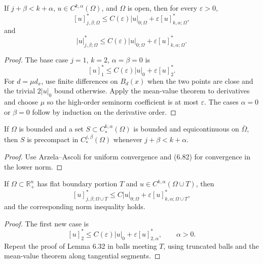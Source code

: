 \begin{lemma}
\label{gt-ch06-lem-6-32}
If $j+\beta<k+\alpha$, $u\in C^{k,\alpha}(\Omega)$, and $\Omega$ is open, then
for every $\varepsilon>0$,
\begin{equation}\tag{6.82}
[u]^*_{j,\beta;\Omega}\le C(\varepsilon)|u|_{0;\Omega}+\varepsilon [u]^*_{k,\alpha;\Omega},
\end{equation}
and
\[
|u|^*_{j,\beta;\Omega}\le C(\varepsilon)|u|_{0;\Omega}+\varepsilon [u]^*_{k,\alpha;\Omega}.
\]
\end{lemma}
\begin{proof}
\sketch The base case $j=1$, $k=2$, $\alpha=\beta=0$ is
\begin{equation}
\tag{6.83}
[u]^*_1\leq C(\varepsilon)|u|_0+\varepsilon[u]^*_2.
\end{equation}
For $d=\mu d_x$, use finite differences on $B_d(x)$ when the two
points are close and the trivial $2|u|_0$ bound otherwise.  Apply the mean-value
theorem to derivatives and choose $\mu$ so the high-order seminorm coefficient
is at most $\varepsilon$.  The cases $\alpha=0$ or $\beta=0$ follow by induction
on the derivative order.
\end{proof}

\begin{lemma}
\label{gt-ch06-lem-6-33}
If $\Omega$ is bounded and a set $S\subset C_*^{k,\alpha}(\Omega)$ is bounded
and equicontinuous on $\bar\Omega$, then $S$ is precompact in
$C_*^{j,\beta}(\Omega)$ whenever $j+\beta<k+\alpha$.
\end{lemma}
\begin{proof}
\sketch Use Arzela--Ascoli for uniform convergence and (6.82) for convergence
in the lower norm.
\end{proof}

\begin{lemma}
\label{gt-ch06-lem-6-34}
If $\Omega\subset\mathbb R^n_+$ has flat boundary portion $T$ and
$u\in C^{k,\alpha}(\Omega\cup T)$, then
\begin{equation}
\tag{6.89}
[u]^*_{j,\beta;\Omega\cup T}
\leq C|u|_{0;\Omega}+\varepsilon[u]^*_{k,\alpha;\Omega\cup T},
\end{equation}
and the corresponding norm inequality holds.
\end{lemma}
\begin{proof}
\sketch The first new case is
\begin{equation}
\tag{6.90}
[u]^*_2\leq C(\varepsilon)|u|_0+\varepsilon[u]^*_{2,\alpha},
\qquad\alpha>0.
\end{equation}
Repeat the proof of Lemma 6.32 in balls meeting $T$, using truncated
balls and the mean-value theorem along tangential segments.
\end{proof}

